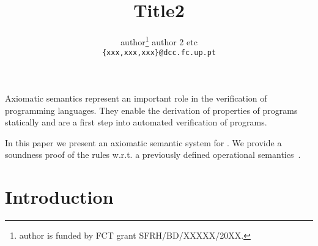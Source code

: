 \documentclass[11pt,twoside]{article}
\makeatletter
\def\cleardoublepage{\clearpage\if@twoside \ifodd\c@page\else%
\hbox{}%
\thispagestyle{empty}
\newpage%
\if@twocolumn\hbox{}\newpage\fi\fi\fi}
\makeatother
\begin{document}


\mkcoverpage

\title{Title2}
\author{author\thanks{author is funded by FCT grant
SFRH/BD/XXXXX/20XX.}\hspace{0.5cm} author 2 \hspace{0.5cm}
etc\\ {\tt \{xxx,xxx,xxx\}@dcc.fc.up.pt}}

\date{}
\cleardoublepage

\maketitle

\abstract

Axiomatic semantics represent an important role in the verification of
programming languages.
%
They enable the derivation of properties of programs statically and are
a first step into automated verification of programs.


In this paper we present an axiomatic semantic system for \Prolog.
%
We provide a soundness proof of the rules w.r.t. a previously defined
operational semantics~\cite{PlOpSem}.




\section{Introduction}



\end{document}
